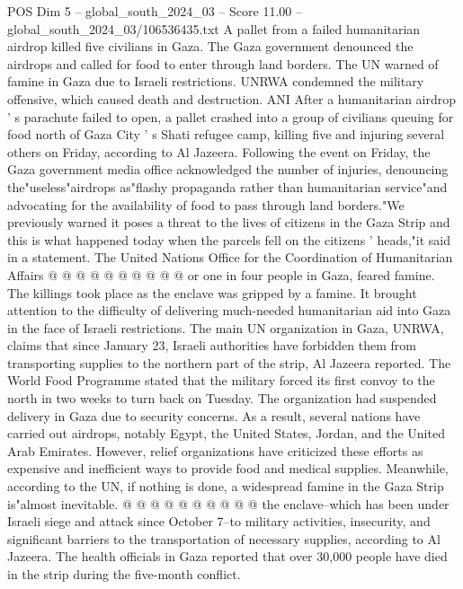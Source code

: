 \begin{textsample}{POS Dim 5 – global\_south\_2024\_03 – Score 11.00 – global\_south\_2024\_03/106536435.txt}  \label{ex:f5_pos_150}
A pallet from a failed humanitarian airdrop killed five civilians in Gaza.
The Gaza government denounced the airdrops and called for food to enter through land borders.
The UN warned of famine in Gaza due to Israeli restrictions.
UNRWA condemned the military offensive, which caused death and destruction.
ANI After a humanitarian airdrop ' s parachute failed to open, a pallet crashed into a group of civilians queuing for food north of Gaza City ' s Shati refugee camp, killing five and injuring several others on Friday, according to Al Jazeera.
Following the event on Friday, the Gaza government media office acknowledged the number of injuries, denouncing the"useless"airdrops as"flashy propaganda rather than humanitarian service"and advocating for the availability of food to pass through land borders."We previously warned it poses a threat to the lives of citizens in the Gaza Strip and this is what happened today when the parcels fell on the citizens ' heads,"it said in a statement.
The United Nations Office for the Coordination of Humanitarian Affairs @ @ @ @ @ @ @ @ @ @ or one in four people in Gaza, feared famine.
The killings took place as the enclave was gripped by a famine.
It brought attention to the difficulty of delivering much-needed humanitarian aid into Gaza in the face of Israeli restrictions.
The main UN organization in Gaza, UNRWA, claims that since January 23, Israeli authorities have forbidden them from transporting supplies to the northern part of the strip, Al Jazeera reported.
The World Food Programme stated that the military forced its first convoy to the north in two weeks to turn back on Tuesday.
The organization had suspended delivery in Gaza due to security concerns.
As a result, several nations have carried out airdrops, notably Egypt, the United States, Jordan, and the United Arab Emirates.
However, relief organizations have criticized these efforts as expensive and inefficient ways to provide food and medical supplies.
Meanwhile, according to the UN, if nothing is done, a widespread famine in the Gaza Strip is"almost inevitable. @ @ @ @ @ @ @ @ @ @ the enclave--which has been under Israeli siege and attack since October 7--to military activities, insecurity, and significant barriers to the transportation of necessary supplies, according to Al Jazeera.
The health officials in Gaza reported that over 30,000 people have died in the strip during the five-month conflict.

\end{textsample}
